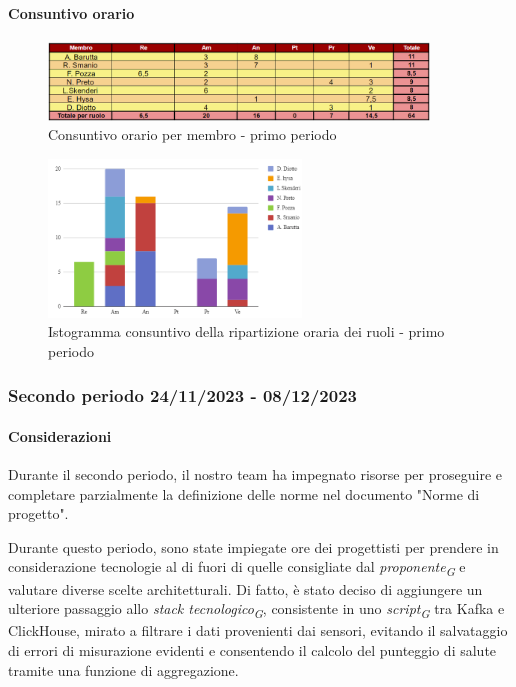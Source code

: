 \paragraph{Consuntivo orario} \hspace{1pt}

\begin{figure}[H]
    \centering
    \includegraphics[width=0.9\textwidth]{../Images/consuntivoOrario1Periodo.png}
    \caption{Consuntivo orario per membro - primo periodo}
    \label{fig:Constuntivo_orario_1}
\end{figure}

\begin{figure}[H]
    \centering
    \includegraphics[width=0.6\textwidth]{../Images/consuntivoDivisioneRuoli1Periodo.png}
    \caption{Istogramma consuntivo della ripartizione oraria dei ruoli - primo periodo}
    \label{fig:Consuntivo_ripartizione_oraria_1}
\end{figure}


\subsubsection{Secondo periodo  24/11/2023 - 08/12/2023}
\paragraph{Considerazioni}

Durante il secondo periodo, il nostro team ha impegnato risorse per proseguire e completare parzialmente la definizione delle norme nel documento "Norme di progetto".

Durante questo periodo, sono state impiegate ore dei progettisti per prendere in considerazione tecnologie al di fuori di quelle consigliate dal \textit{proponente}\textsubscript{\textit{G}} e valutare diverse scelte architetturali. Di fatto, è stato deciso di aggiungere un ulteriore passaggio allo \textit{stack tecnologico}\textsubscript{\textit{G}}, consistente in uno \textit{script}\textsubscript{\textit{G}} tra Kafka e ClickHouse, mirato a filtrare i dati provenienti dai sensori, evitando il salvataggio di errori di misurazione evidenti e consentendo il calcolo del punteggio di salute tramite una funzione di aggregazione.

